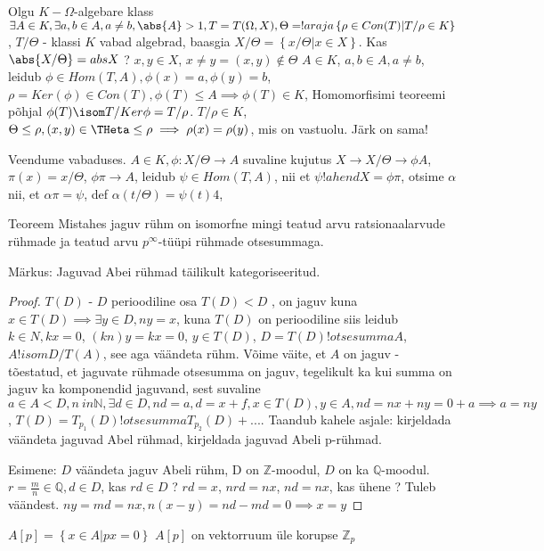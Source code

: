 \documentclass[12pt]{report}
\numberwithin{equation}{section}
\theoremstyle{definition}
\theoremstyle{plain}
\begin{document}
Olgu $K - \Omega$-algebare klass
$\exists A \in K, \exists a,b \in A, a \neq b, \abs{A} > 1, T = T(\Omega,X), \Theta = !araja \left\lbrace \rho \in Con(T) | T/ \rho \in K \right\rbrace$, $T / \Theta $ - klassi $K$ vabad algebrad, baasgia $X / \Theta = \left\lbrace x / \Theta | x \in X \right\rbrace$. Kas $\abs{X / \Theta} = abs{X}$ ? $x,y \in X$, $x \neq y = (x,y) \not \in \Theta$
$A \in K$, $a,b \in A, a \neq b$, leidub $\phi \in Hom(T,A), \phi(x) = a, \phi(y) = b$, $\rho = Ker(\phi) \in Con(T), \phi(T) \leq A \implies \phi(T) \in K$, Homomorfisimi teoreemi põhjal $\phi(T) \isom T/Ker \phi = T / \rho$. $T/ \rho \in K$, $\Theta \leq \rho, (x,y) \in \THeta \leq \rho \implies \rho(x) = \rho(y)$, mis on vastuolu. Järk on sama!

Veendume vabaduses. $A \in K, \phi: X/ \Theta \to A$ suvaline kujutus $X \to X/ \Theta \to \phi A$, $\pi(x) = x/ \Theta$, $\phi \pi \to A$, leidub $\psi \in Hom(T,A)$, nii et $\psi !ahend X = \phi \pi$, otsime $\alpha$ nii, et $\alpha \pi = \psi$, def $\alpha(t/ \Theta) = \psi(t)4$, 


Teoreem Mistahes jaguv r\"uhm on isomorfne mingi teatud arvu ratsionaalarvude r\"uhmade ja teatud arvu $p^\infty$-t\"u\"upi r\"uhmade otsesummaga.

Märkus: Jaguvad Abei r\"uhmad täilikult kategoriseeritud.
\begin{proof}
$T(D)$ - $D$ perioodiline osa $T(D) < D$ , on jaguv kuna $x \in T(D) \implies \exists y \in D, ny = x$, kuna $T(D)$ on perioodiline siis leidub $k \in N, kx = 0$, $(kn)y = kx = 0$, $y \in T(D)$, $D = T(D) !otsesumma A$, $A !isom D/T(A)$, see aga väändeta r\"uhm. Võime väite, et $A$ on jaguv - tõestatud, et jaguvate r\"uhmade otsesumma on jaguv, tegelikult ka kui summa on jaguv ka komponendid jaguvand, sest suvaline $ a \in A < D , n \ in \mathbb{N}, \exists d \in D, nd = a, d = x +f, x \in T(D), y \in A, nd = nx + ny = 0 + a \implies a = ny$, $T(D) = T_{p_1}(D) !otsesumma T_{p_2}(D) + ....$ Taandub kahele asjale: kirjeldada väändeta jaguvad Abel r\"uhmad, kirjeldada jaguvad Abeli p-r\"uhmad.

Esimene: $D$ väändeta jaguv Abeli r\"uhm, D on $\mathbb{Z}$-moodul, $D$ on ka $\mathbb{Q}$-moodul. $r = \frac{m}{n} \in \mathbb{Q}, d \in D$, kas $rd \in D$ ? $rd = x$, $nrd = nx$, $nd=nx$, kas \"uhene ? Tuleb väändest. $ny = md = nx, n(x-y) = nd-md = 0 \implies x=y$
\end{proof} 

$A[p] = \left\lbrace x \in A | px = 0 \right\rbrace$
$A[p]$ on vektorruum \"ule korupse $\mathbb{Z}_p$
\end{document}
